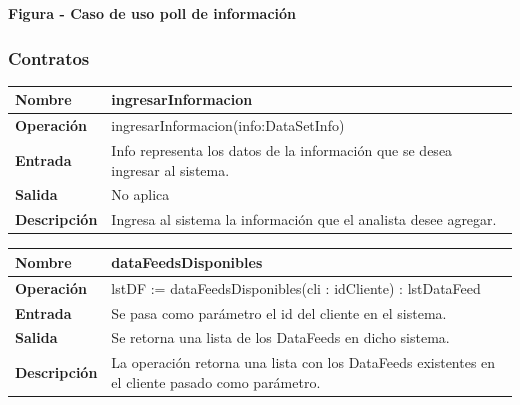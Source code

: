 \documentclass[11pt]{article}
\newcounter{Figura}
\renewcommand\theFigura{\arabic{Figura}}
\begin{document}
{\centering{}\bfseries
\foreignlanguage{spanish}{Figura }\stepcounter{Figura}{\theFigura}\foreignlanguage{spanish}{ - Caso de uso poll de
información}
\par}

\subsubsection{Contratos}

\bigskip

\begin{flushleft}
\tablefirsthead{}
\tablehead{}
\tabletail{}
\tablelasttail{}
\begin{supertabular}{|m{1.0115598in}|m{4.7441597in}|}
\hline
{\bfseries Nombre} &
{\bfseries ingresarInformacion}\\\hline
{\bfseries Operación} &
{ ingresarInformacion(info:DataSetInfo)}\\\hline
{\bfseries Entrada} &
{ Info representa los datos de la información que se desea ingresar al sistema.}\\\hline
{\bfseries Salida} &
{ No aplica}\\\hline
{\bfseries Descripción} &
{ Ingresa al sistema la información que el analista desee agregar.}\\\hline
\end{supertabular}
\end{flushleft}

\bigskip

\begin{flushleft}
\tablefirsthead{}
\tablehead{}
\tabletail{}
\tablelasttail{}
\begin{supertabular}{|m{1.0115598in}|m{4.7441597in}|}
\hline
{\bfseries Nombre} &
{\bfseries dataFeedsDisponibles}\\\hline
{\bfseries Operación} &
{ lstDF := dataFeedsDisponibles(cli : idCliente) : lstDataFeed}\\\hline
{\bfseries Entrada} &
{ Se pasa como parámetro el id del cliente en el sistema.}\\\hline
{\bfseries Salida} &
{ Se retorna una lista de los DataFeeds en dicho sistema.}\\\hline
{\bfseries Descripción} &
{ La operación retorna una lista con los DataFeeds existentes en el cliente pasado como
parámetro.}\\\hline
\end{supertabular}
\end{flushleft}
\end{document}
